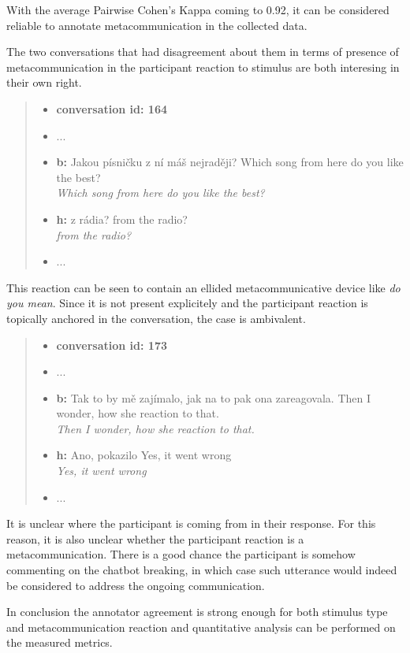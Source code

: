\documentclass[12pt]{report}
\newcommand{\utterance}[3]{%
    \textbf{#1} #2%
    \ifx\relax#3\relax%
    \else \\ \textit{#3}%
    \fi%
}
\begin{document}
{With the average Pairwise Cohen's Kappa coming to 0.92,
it can be considered reliable to annotate metacommunication
in the collected data.

The two conversations that had disagreement about them in terms of
presence of metacommunication in the participant reaction to stimulus
are both interesing in their own right.


\begin{quote}
\begin{itemize}[label={}, leftmargin=0pt, itemsep=0.5em]
\item \textbf{conversation id: 164}
\item ...
\item \utterance{b:}{Jakou písničku z ní máš nejraději?}{Which song from here do you like the best?}
\item \utterance{h:}{z rádia?}{from the radio?}
\item ...
\end{itemize}
\end{quote}

This reaction can be seen to contain an ellided metacommunicative device like \textit{do you mean}.
Since it is not present explicitely and the participant reaction is topically anchored in the conversation,
the case is ambivalent.

\begin{quote}
\begin{itemize}[label={}, leftmargin=0pt, itemsep=0.5em]
\item \textbf{conversation id: 173}
\item ...
\item \utterance{b:}{Tak to by mě zajímalo, jak na to pak ona zareagovala.}{Then I wonder, how she reaction to that.}
\item \utterance{h:}{Ano, pokazilo}{Yes, it went wrong}
\item ...
\end{itemize}
\end{quote}

It is unclear where the participant is coming from in their response.
For this reason, it is also unclear whether the participant reaction is a metacommunication.
There is a good chance the participant is somehow commenting on the chatbot breaking,
in which case such utterance would indeed be considered to address the ongoing communication.

\par
In conclusion the annotator agreement is
strong enough for both stimulus type and metacommunication reaction and
quantitative analysis can be performed on the measured metrics.





}
\end{document}
